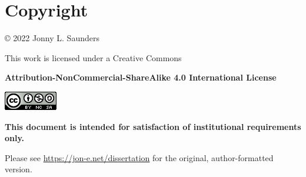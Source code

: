 
\chapter*{Copyright}
\vspace{1in}
\begin{centering}
© 2022 Jonny L. Saunders

This work is licensed under a Creative Commons

\textbf{Attribution-NonCommercial-ShareAlike 4.0 International License}
\begin{center}
\href{https://creativecommons.org/licenses/by-nc-sa/4.0/}{\includegraphics{prefatory/cc-license.png}}
\end{center}

\vspace{1.5in}

\textbf{This document is intended for satisfaction of institutional requirements only.}

\begin{center}
Please see \url{https://jon-e.net/dissertation} for the original, author-formatted version.
\end{center}
\end{centering}
